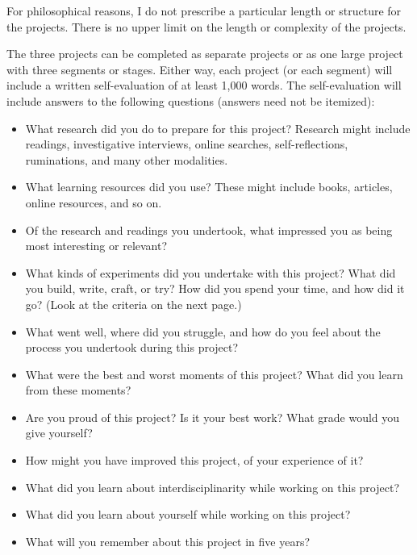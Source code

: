 \documentclass[letterpaper,10pt,headsepline]{scrreprt}
\begin{document}
For philosophical reasons, I do not prescribe a particular length or structure for the projects. There is no upper limit on the length or complexity of the projects.

The three projects can be completed as separate projects or as one large project with three segments or stages. Either way, each project (or each segment) will include a written self-evaluation of at least 1,000 words. The self-evaluation will include answers to the following questions (answers need not be itemized): 

 \begin{itemize}
\item What research did you do to prepare for this project? Research might include readings, investigative interviews, online searches, self-reflections, ruminations, and many other modalities. 

\item What learning resources did you use? These might include books, articles, online resources, and so on.

\item Of the research and readings you undertook, what impressed you as being most interesting or relevant?

\item What kinds of experiments did you undertake with this project? What did you build, write, craft, or try? How did you spend your time, and how did it go? (Look at the criteria on the next page.)

\item What went well, where did you struggle, and how do you feel about the process you undertook during this project?

\item What were the best and worst moments of this project? What did you learn from these moments?

\item Are you proud of this project? Is it your best work? What grade would you give yourself?

\item How might you have improved this project, of your experience of it?

\item What did you learn about interdisciplinarity while working on this project?

\item What did you learn about yourself while working on this project?

\item What will you remember about this project in five years?


\end{itemize}
\end{document}
